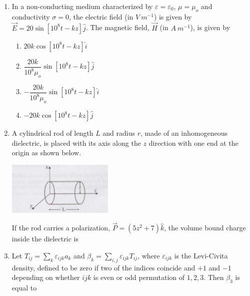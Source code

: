 \documentclass[14pt, a4paper]{extarticle}
\begin{document}
\begin{enumerate}[label=\textbf{Q. \arabic*}, start=21]
\item In a non-conducting medium characterized by $\varepsilon = \varepsilon_0$, $\mu = \mu_o$ and conductivity $\sigma = 0$, the electric field (in $V~m^{-1}$) is given by $\vec{E} = 20\sin[10^8 t - kz] \hat{j}$. The magnetic field, $\vec{H}$ (in $A~m^{-1}$), is given by
\begin{enumerate}[label=(\Alph*)]
\item $20k \cos[10^8 t - kz] \hat{i}$
\item $\dfrac{20k}{10^8 \mu_o}\sin[10^8 t - kz] \hat{j}$
\item $-\dfrac{20k}{10^8 \mu_o}\sin[10^8 t - kz] \hat{i}$
\item $-20k \cos[10^8 t - kz] \hat{j}$
\end{enumerate}

\item A cylindrical rod of length $L$ and radius $r$, made of an inhomogeneous dielectric, is placed with its axis along the $z$ direction with one end at the origin as shown below.
    \begin{center}
        \includegraphics[width=0.4\textwidth]{figs/Q25fig.png}
    \end{center}
    If the rod carries a polarization, $\vec{P} = (5z^2 + 7)\hat{k}$, the volume bound charge inside the dielectric is
    \begin{enumerate}[label=(\Alph*)]
    \end{enumerate}

\item Let $T_{ij} = \sum_k \varepsilon_{ijk} a_k$ and $\beta_k = \sum_{i,j} \varepsilon_{ijk} T_{ij}$, where $\varepsilon_{ijk}$ is the Levi-Civita density, defined to be zero if two of the indices coincide and $+1$ and $-1$ depending on whether $ijk$ is even or odd permutation of $1,2,3$. Then $\beta_3$ is equal to
\begin{enumerate}[label=(\Alph*)]
\end{enumerate}


\end{enumerate}
\end{document}
